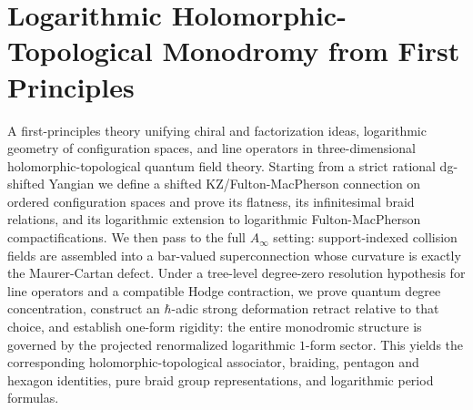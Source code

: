 

\providecommand{\A}{\mathcal A}
\providecommand{\B}{\mathcal B}
\providecommand{\C}{\mathcal C}
\providecommand{\D}{\mathcal D}
\providecommand{\E}{\mathcal E}
\providecommand{\F}{\mathcal F}
\providecommand{\FM}{\mathrm{FM}}
\providecommand{\Conf}{\mathrm{Conf}}
\providecommand{\HT}{\mathrm{HT}}
\providecommand{\MC}{\mathrm{MC}}
\providecommand{\End}{\mathrm{End}}
\providecommand{\Hom}{\mathrm{Hom}}
\providecommand{\id}{\mathrm{id}}
\providecommand{\im}{\mathrm{im}}
\providecommand{\Res}{\mathrm{Res}}
\providecommand{\Aut}{\mathrm{Aut}}
\providecommand{\PP}{\mathbb P}
\providecommand{\AA}{\mathbb A}
\providecommand{\CC}{\mathbb C}
\providecommand{\RR}{\mathbb R}
\providecommand{\ZZ}{\mathbb Z}
\providecommand{\kk}{\Bbbk}
\providecommand{\h}{\hbar}
\providecommand{\ot}{\otimes}
\providecommand{\wot}{\widehat\otimes}
\providecommand{\s}{\mathrm s}
\providecommand{\ds}{d_{\mathrm{dR}}}
\providecommand{\CYB}{\mathrm{CYB}}
\providecommand{\PT}{\mathrm{PT}}
\providecommand{\Disk}{\mathrm{Disk}}
\providecommand{\SN}{\boldsymbol{\nabla}}
\providecommand{\bboxprod}{\mathop{\boxtimes}\displaylimits}


\chapter{Logarithmic Holomorphic-Topological Monodromy from First Principles}
\label{chap:log-ht-monodromy-standalone}

\begin{summary}
A first-principles theory unifying chiral and factorization ideas, logarithmic geometry of configuration spaces, and line operators in three-dimensional holomorphic-topological quantum field theory. Starting from a strict rational dg-shifted Yangian we define a shifted KZ/Fulton-MacPherson connection on ordered configuration spaces and prove its flatness, its infinitesimal braid relations, and its logarithmic extension to logarithmic Fulton-MacPherson compactifications. We then pass to the full $A_\infty$ setting: support-indexed collision fields are assembled into a bar-valued superconnection whose curvature is exactly the Maurer-Cartan defect. Under a tree-level degree-zero resolution hypothesis for line operators and a compatible Hodge contraction, we prove quantum degree concentration, construct an $\h$-adic strong deformation retract relative to that choice, and establish one-form rigidity: the entire monodromic structure is governed by the projected renormalized logarithmic $1$-form sector. This yields the corresponding holomorphic-topological associator, braiding, pentagon and hexagon identities, pure braid group representations, and logarithmic period formulas.
\end{summary}

